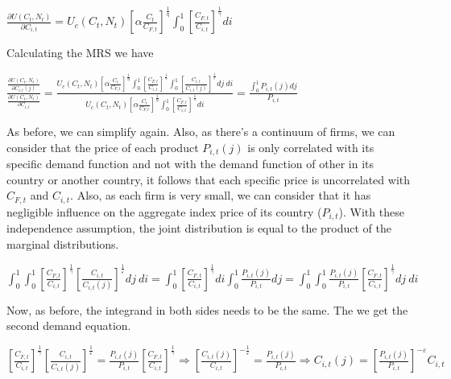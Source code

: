 \documentclass[
]{article}
\begin{document}
\(\displaystyle \frac{\partial U(C_t,N_t)}{\partial C_{i,t}} = U_c(C_t,N_t) \left[ \alpha \frac{C_t}{C_{F,t}} \right]^{\frac{1}{\eta}} \int_0^1 \left[\frac{C_{F,t}}{C_{i,t}}\right]^{\frac{1}{\gamma}} di\)

Calculating the MRS we have

\(\displaystyle \frac{\displaystyle \frac{\partial U(C_t,N_t)}{\displaystyle \partial C_{i,t}(j)}}{\frac{\displaystyle \partial U(C_t,N_t)}{\displaystyle \partial C_{i,t}}} = \frac{\displaystyle U_c(C_t,N_t) \left[ \alpha \frac{C_t}{C_{F,t}} \right]^{\frac{1}{\eta}} \int_0^1 \left[\frac{C_{F,t}}{C_{i,t}}\right]^{\frac{1}{\gamma}} \int_0^1 \left[\frac{C_{i,t}}{C_{i,t}(j)}\right]^{\frac{1}{\varepsilon}}dj \ di }{\displaystyle U_c(C_t,N_t) \left[ \alpha \frac{C_t}{C_{F,t}} \right]^{\frac{1}{\eta}} \int_0^1 \left[\frac{C_{F,t}}{C_{i,t}}\right]^{\frac{1}{\gamma}} di} = \frac{\displaystyle \int_0^1P_{i,t}(j)dj}{P_{i,t}}\)

As before, we can simplify again. Also, as there's a continuum of firms,
we can consider that the price of each product \(P_{i,t}(j)\) is only
correlated with its specific demand function and not with the demand
function of other in its country or another country, it follows that
each specific price is uncorrelated with \(C_{F,t}\) and \(C_{i,t}\).
Also, as each firm is very small, we can consider that it has negligible
influence on the aggregate index price of its country (\(P_{i,t}\)).
With these independence assumption, the joint distribution is equal to
the product of the marginal distributions.

\(\displaystyle \int_0^1 \int_0^1 \left[\frac{C_{F,t}}{C_{i,t}}\right]^{\frac{1}{\gamma}} \left[\frac{C_{i,t}}{C_{i,t}(j)}\right]^{\frac{1}{\varepsilon}}dj \ di = \int_0^1 \left[\frac{C_{F,t}}{C_{i,t}}\right]^{\frac{1}{\gamma}} di \int_0^1 \frac{\displaystyle P_{i,t}(j)}{P_{i,t}}dj = \int_0^1 \int_0^1 \frac{\displaystyle P_{i,t}(j)}{P_{i,t}} \left[\frac{C_{F,t}}{C_{i,t}}\right]^{\frac{1}{\gamma}} dj \ di\)

Now, as before, the integrand in both sides needs to be the same. The we
get the second demand equation.

\(\displaystyle \left[\frac{C_{F,t}}{C_{i,t}}\right]^{\frac{1}{\gamma}} \left[\frac{C_{i,t}}{C_{i,t}(j)}\right]^{\frac{1}{\varepsilon}} = \frac{\displaystyle P_{i,t}(j)}{P_{i,t}} \left[\frac{C_{F,t}}{C_{i,t}}\right]^{\frac{1}{\gamma}} \Rightarrow \left[\frac{C_{i,t}(j)}{C_{i,t}}\right]^{-\frac{1}{\varepsilon}} = \frac{\displaystyle P_{i,t}(j)}{P_{i,t}} \Rightarrow C_{i,t}(j) = \left[ \frac{\displaystyle P_{i,t}(j)}{P_{i,t}} \right]^{-\varepsilon}C_{i,t}\)
\end{document}
